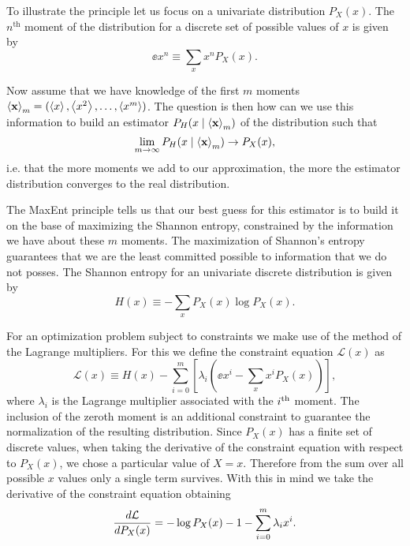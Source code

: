 To illustrate the principle let us focus on a univariate distribution $P_X(x)$.
The $n^{\text{th}}$ moment of the distribution for a discrete set of possible
values of $x$ is given by
\begin{equation}
  \ee{x^n} \equiv \sum_x x^n P_X(x).
  \label{eq_mom_ref}
\end{equation}

Now assume that we have knowledge of the first $m$ moments $\mathbf{\left\langle x \right\rangle}_m = (
\left\langle x \right\rangle, \left\langle x^2 \right\rangle, \ldots, \left\langle x^m \right\rangle )$. The question is then how can we use this
information to build an estimator $P_H(x \mid \mathbf{\left\langle x \right\rangle}_m)$ of the
distribution
such that
\begin{equation}
  \lim_{m \rightarrow \infty} P_H(x \mid \mathbf{\left\langle x \right\rangle}_m) \rightarrow P_X(x),
\end{equation}
i.e. that the more moments we add to our approximation, the more the estimator
distribution converges to the real distribution.

The MaxEnt principle tells us that our best guess for this estimator is to
build it on the base of maximizing the Shannon entropy, constrained by the
information we have about these $m$ moments. The maximization of Shannon's
entropy guarantees that we are the least committed possible to information that
we do not posses. The Shannon entropy for an univariate discrete distribution
is given by \cite{Shannon1948}
\begin{equation}
  H(x) \equiv - \sum_x P_X(x) \log P_X(x).
\end{equation}

For an optimization problem subject to constraints we make use of the method of
the Lagrange multipliers. For this we define the constraint equation
$\mathcal{L}(x)$ as
\begin{equation}
  \mathcal{L}(x) \equiv H(x) - \sum_{i=0}^m
  \left[ \lambda_i \left( \ee{x^i} - \sum_x x^i P_X(x) \right) \right],
  \label{seq_constraint_eq}
\end{equation}
where $\lambda_i$ is the Lagrange multiplier associated with the $i^\text{th}$ moment.
The inclusion of the zeroth moment is an additional constraint to guarantee the
normalization of the resulting distribution. Since $P_X(x)$ has a finite set of
discrete values, when taking the derivative of the constraint equation with
respect to $P_X(x)$, we chose a particular value of $X = x$. Therefore from the
sum over all possible $x$ values only a single term survives. With this in mind
we take the derivative of the constraint equation obtaining
\begin{equation}
  {d\mathcal{L} \over d P_X(x)} = -\log P_X(x) - 1 -
  \sum_{i=0}^m \lambda_i x^i.
\end{equation}

